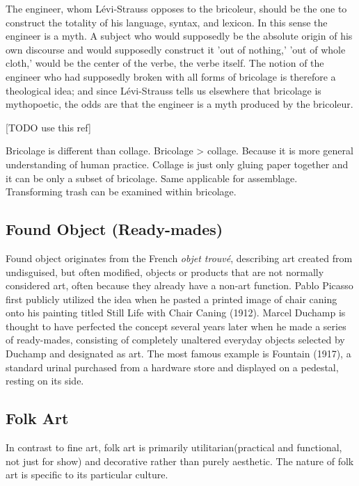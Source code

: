 \begin{blockquote}
The engineer, whom Lévi-Strauss opposes to the bricoleur, should be the one to construct the totality of his language, syntax, and lexicon. In this sense the engineer is a myth. A subject who would supposedly be the absolute origin of his own discourse and would supposedly construct it 'out of nothing,' 'out of whole cloth,' would be the center of the verbe, the verbe itself. The notion of the engineer who had supposedly broken with all forms of bricolage is therefore a theological idea; and since Lévi-Strauss tells us elsewhere that bricolage is mythopoetic, the odds are that the engineer is a myth produced by the bricoleur.\cite{derrida1993structure}
\end{blockquote}

[TODO use this ref]\cite{strasser1999waste}

Bricolage is different than collage. Bricolage > collage. Because it is more general understanding of human practice. Collage is just only gluing paper together and it can be only a subset of bricolage. Same applicable for assemblage. Transforming trash can be examined within bricolage. 


\subsection{Found Object (Ready-mades)}
Found object originates from the French \textit{objet trouvé}, describing art created from undisguised, but often modified, objects or products that are not normally considered art, often because they already have a non-art function. Pablo Picasso first publicly utilized the idea when he pasted a printed image of chair caning onto his painting titled Still Life with Chair Caning (1912). Marcel Duchamp is thought to have perfected the concept several years later when he made a series of ready-mades, consisting of completely unaltered everyday objects selected by Duchamp and designated as art. The most famous example is Fountain (1917), a standard urinal purchased from a hardware store and displayed on a pedestal, resting on its side.

\subsection{Folk Art}
In contrast to fine art, folk art is primarily utilitarian(practical and functional, not just for show) and decorative rather than purely aesthetic. The nature of folk art is specific to its particular culture.

